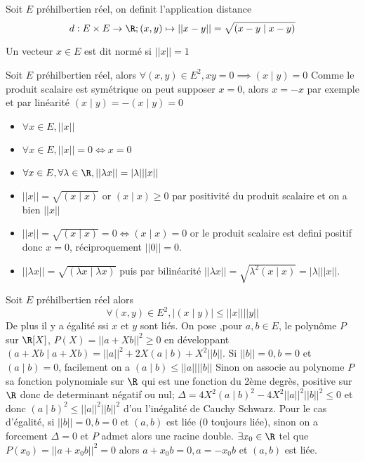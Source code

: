 \begin{defini}
    Soit $E$ préhilbertien réel, on definit l'application distance $$d: E \times E \to \R; (x,y)\mapsto ||x-y||=\sqrt{(x-y\mid x-y)}$$
\end{defini}
\begin{defini}
    Un vecteur $x\in E$ est dit normé si $||x||=1$
\end{defini}
\begin{prop}
    Soit $E$ préhilbertien réel, alors $\forall(x,y)\in E^2, xy=0\implies (x\mid y)=0$
    \tcblower
    Comme le produit scalaire est symétrique on peut supposer $x=0$, alors $x=-x$ par exemple et par linéarité $(x\mid y)=-(x\mid y)=0$
\end{prop}
\begin{prop}
    \begin{itemize}
        \item $\forall x\in E, ||x||$
        \item $\forall x\in E, ||x||=0 \iff x=0$
        \item $ \forall x\in E, \forall \lambda \in \R, ||\lambda x||=|\lambda| ||x||$
    \end{itemize}
    \tcblower
    \begin{itemize}
        \item $||x||=\sqrt{(x\mid x)}$ or $(x\mid x)\geq 0$ par positivité du produit scalaire et on a bien $||x||$
        \item $||x||=\sqrt{(x\mid x)}=0\iff (x\mid x)=0$ or le produit scalaire est defini positif donc $x=0$, réciproquement $||0||=0$.
        \item $||\lambda x||=\sqrt{(\lambda x\mid \lambda x)}$ puis par bilinéarité $||\lambda x||=\sqrt{\lambda^2( x\mid x)}=|\lambda| ||x||$.
    \end{itemize}
\end{prop}
\begin{prop}
    Soit $E$ préhilbertien réel alors $$\forall (x,y)\in E^2, |(x\mid y)|\leq ||x|| ||y||$$
    De plus il y a égalité ssi $x$ et $y$ sont liés.
    \tcblower
    On pose ,pour $a,b\in E$, le polynôme $P$ sur $\R [X]$, $P(X)=||a+Xb||^2\geq 0$ en développant $(a+Xb\mid a+Xb)=||a||^2+2X(a\mid b)+X^2||b||$.
    Si $||b||=0,b=0$ et $(a\mid b)=0$, facilement on a $(a\mid b)\leq ||a|| ||b||$
    Sinon on associe au polynome $P$ sa fonction polynomiale sur $\R$ qui est une fonction du 2ème degrès, positive sur $\R$ donc de determinant négatif ou nul; $\Delta = 4X^2(a\mid b)^2-4X^2||a||^2||b||^2\leq 0$ et donc $(a\mid b)^2\leq ||a||^2||b||^2$ d'ou l'inégalité de Cauchy Schwarz.
    Pour le cas d'égalité, si $||b||=0,b=0$ et $(a,b)$ est liée (0 toujours liée), sinon on a forcement $\Delta=0$ et $P$ admet alors une racine double. $\exists x_0\in \R$ tel que $P(x_0)=||a+x_0b||^2=0$ alors $a+x_0b=0,a=-x_0b$ et $(a,b)$ est liée.
\end{prop}
\begin{prop}
     
\end{prop}